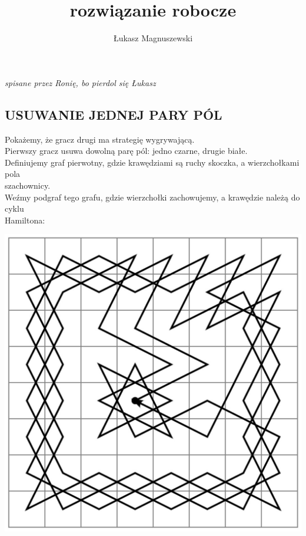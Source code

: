 \documentclass{article}
\title{\ttfamily {\color{emp}SKOCZEK}\medskip\\ \normalsize {\color{dygresyja}rozwiązanie robocze}}
\author{{\color{tit}Łukasz Magnuszewski}}
\date{}
\begin{document}
\ttfamily
\maketitle\smallskip
\begin{center}\emph{\scriptsize\color{dygresyja}spisane przez Ronię, bo pierdol się Łukasz}\end{center}

\subsection*{USUWANIE JEDNEJ PARY PÓL}
Pokażemy, że gracz drugi ma strategię wygrywającą.\smallskip\\
Pierwszy gracz usuwa dowolną parę pól: jedno czarne, drugie białe. \bigskip\\
Definiujemy graf pierwotny, gdzie krawędziami są ruchy skoczka, a wierzchołkami pola \\szachownicy.\medskip\\
Weźmy podgraf tego grafu, gdzie wierzchołki zachowujemy, a krawędzie należą do cyklu \\Hamiltona:\bigskip\\
\begin{center}
\includegraphics[scale=0.2]{podpierdalanko.png}
\end{center}\bigskip
\end{document}

